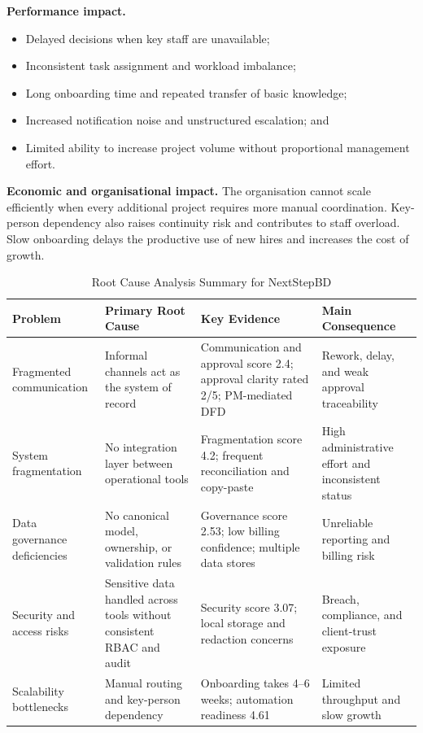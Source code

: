 \documentclass[12pt,a4paper]{report}
\begin{document}
\textbf{Performance impact.}
\begin{itemize}[leftmargin=1.6em]
    \item Delayed decisions when key staff are unavailable;
    \item Inconsistent task assignment and workload imbalance;
    \item Long onboarding time and repeated transfer of basic knowledge;
    \item Increased notification noise and unstructured escalation; and
    \item Limited ability to increase project volume without proportional management effort.
\end{itemize}

\textbf{Economic and organisational impact.}
The organisation cannot scale efficiently when every additional project requires more manual
coordination. Key-person dependency also raises continuity risk and contributes to staff overload.
Slow onboarding delays the productive use of new hires and increases the cost of growth.

\begin{table}[H]
\centering
\caption{Root Cause Analysis Summary for NextStepBD}
\label{tab:root-cause-summary}
\small
\renewcommand{\arraystretch}{1.25}
\begin{tabularx}{\textwidth}{>{\raggedright\arraybackslash}p{2.7cm}
                                >{\raggedright\arraybackslash}p{3.6cm}
                                >{\raggedright\arraybackslash}X
                                >{\raggedright\arraybackslash}p{3.0cm}}
\toprule
\textbf{Problem} & \textbf{Primary Root Cause} & \textbf{Key Evidence} & \textbf{Main Consequence} \\
\midrule
Fragmented communication & Informal channels act as the system of record & Communication and approval score 2.4; approval clarity rated 2/5; PM-mediated DFD & Rework, delay, and weak approval traceability \\
System fragmentation & No integration layer between operational tools & Fragmentation score 4.2; frequent reconciliation and copy-paste & High administrative effort and inconsistent status \\
Data governance deficiencies & No canonical model, ownership, or validation rules & Governance score 2.53; low billing confidence; multiple data stores & Unreliable reporting and billing risk \\
Security and access risks & Sensitive data handled across tools without consistent RBAC and audit & Security score 3.07; local storage and redaction concerns & Breach, compliance, and client-trust exposure \\
Scalability bottlenecks & Manual routing and key-person dependency & Onboarding takes 4--6 weeks; automation readiness 4.61 & Limited throughput and slow growth \\
\bottomrule
\end{tabularx}
\end{table}
\end{document}
